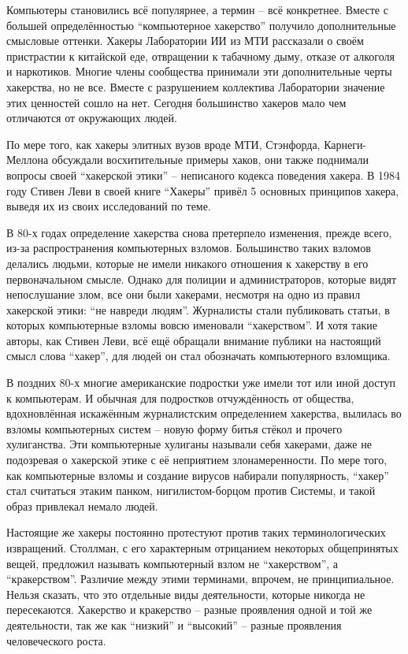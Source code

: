 Компьютеры становились всё популярнее, а термин -- всё конкретнее. Вместе с большей определённостью \enquote{компьютерное хакерство} получило дополнительные смысловые оттенки. Хакеры Лаборатории ИИ из МТИ рассказали о своём пристрастии к китайской еде, отвращении к табачному дыму, отказе от алкоголя и наркотиков. Многие члены сообщества принимали эти дополнительные черты хакерства, но не все. Вместе с разрушением коллектива Лаборатории значение этих ценностей сошло на нет. Сегодня большинство хакеров мало чем отличаются от окружающих людей.

По мере того, как хакеры элитных вузов вроде МТИ, Стэнфорда, Карнеги-Меллона обсуждали восхитительные примеры хаков, они также поднимали вопросы своей \enquote{хакерской этики} -- неписаного кодекса поведения хакера. В 1984 году Стивен Леви в своей книге \enquote{Хакеры} привёл 5 основных принципов хакера, выведя их из своих исследований по теме.

В 80-х годах определение хакерства снова претерпело изменения, прежде всего, из-за распространения компьютерных взломов. Большинство таких взломов делались людьми, которые не имели никакого отношения к хакерству в его первоначальном смысле. Однако для полиции и администраторов, которые видят непослушание злом, все они были хакерами, несмотря на одно из правил хакерской этики: \enquote{не навреди людям}. Журналисты стали публиковать статьи, в которых компьютерные взломы вовсю именовали \enquote{хакерством}. И хотя такие авторы, как Стивен Леви, всё ещё обращали внимание публики на настоящий смысл слова \enquote{хакер}, для людей он стал обозначать компьютерного взломщика.

В поздних 80-х многие американские подростки уже имели тот или иной доступ к компьютерам. И обычная для подростков отчуждённость от общества, вдохновлённая искажённым журналистским определением хакерства, вылилась во взломы компьютерных систем -- новую форму битья стёкол и прочего хулиганства. Эти компьютерные хулиганы называли себя хакерами, даже не подозревая о хакерской этике с её неприятием злонамеренности. По мере того, как компьютерные взломы и создание вирусов набирали популярность, \enquote{хакер} стал считаться этаким панком, нигилистом-борцом против Системы, и такой образ привлекал немало людей.

Настоящие же хакеры постоянно протестуют против таких терминологических извращений. Столлман, с его характерным отрицанием некоторых общепринятых вещей, предложил называть компьютерный взлом не \enquote{хакерством}, а \enquote{кракерством}. Различие между этими терминами, впрочем, не принципиальное. Нельзя сказать, что это отдельные виды деятельности, которые никогда не пересекаются. Хакерство и кракерство -- разные проявления одной и той же деятельности, так же как \enquote{низкий} и \enquote{высокий} -- разные проявления человеческого роста.


